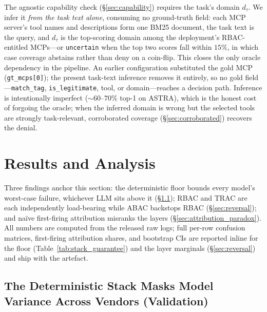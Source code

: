 \documentclass[sigconf,review,anonymous]{acmart}
\begin{document}
The agnostic capability check (\S\ref{sec:capability}) requires the task's domain $d_\tau$. We infer it \emph{from the task text alone}, consuming no ground-truth field: each MCP server's tool names and descriptions form one BM25 document, the task text is the query, and $d_\tau$ is the top-scoring domain among the deployment's RBAC-entitled MCPs---or \texttt{uncertain} when the top two scores fall within $15\%$, in which case coverage abstains rather than deny on a coin-flip. This closes the only oracle dependency in the pipeline. An earlier configuration substituted the gold MCP (\texttt{gt\_mcps[0]}); the present task-text inference removes it entirely, so no gold field---\texttt{match\_tag}, \texttt{is\_legitimate}, tool, or domain---reaches a decision path. Inference is intentionally imperfect ($\sim\!60$--$70\%$ top-1 on ASTRA), which is the honest cost of forgoing the oracle; when the inferred domain is wrong but the selected tools are strongly task-relevant, corroborated coverage (\S\ref{sec:corroborated}) recovers the denial.

\FloatBarrier
\section{Results and Analysis}
\label{sec:results}

Three findings anchor this section: the deterministic floor bounds every model's worst-case failure, whichever LLM sits above it (\S\ref{sec:stack_guarantee}); RBAC and TRAC are each independently load-bearing while ABAC backstops RBAC (\S\ref{sec:reversal}); and na\"ive first-firing attribution misranks the layers (\S\ref{sec:attribution_paradox}). All numbers are computed from the released raw logs; full per-row confusion matrices, first-firing attribution shares, and bootstrap CIs are reported inline for the floor (Table~\ref{tab:stack_guarantee}) and the layer marginals (\S\ref{sec:reversal}) and ship with the artefact.

\subsection{The Deterministic Stack Masks Model Variance Across Vendors (Validation)}
\label{sec:stack_guarantee}
\label{sec:cross_vendor}
\end{document}
